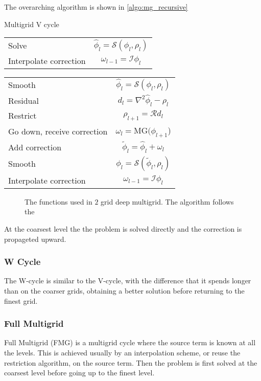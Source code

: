 		The overarching algorithm is shown in \cref{algo:mg_recursive}
		\begin{algorithm}
			\caption{Multigrid V cycle}
	        \begin{algorithmic}
				\State
				\begin{tabular}	{l | c}
					Solve &\( \widehat{\phi}_l = \mathcal{S}(\phi_l, \rho_l)\)
					\\
					Interpolate correction &\( \omega_{l-1} = \mathcal{I} \phi_l\)
				\end{tabular}
				\Else
					\State
					\begin{tabular}	{l | c}
						Smooth &\( \widehat{\phi}_l = \mathcal{S}(\phi_l, \rho_l)\)
						\\
						Residual &	\(d_l = \nabla^2\widehat{\phi}_l - \rho_l\)
						\\
						Restrict &\(\rho_{l+1} = \mathcal{R}d_l \) \nonumber
						\\
						Go down, receive correction & \(\omega_l = \text{MG}( \phi_{l+1}\))
						\\
						Add correction	&\(\widetilde{\phi}_l = \widehat{\phi}_l + \omega_l\)
						\\
						Smooth	&\(\phi_l = \mathcal{S}(\widetilde{\phi}_l, \rho_l)\)
						\\
						Interpolate correction &\( \omega_{l-1} = \mathcal{I} \phi_l\)
					\end{tabular}
	            \EndFor
				\EndIf
	        \end{algorithmic}
			\label{algo:mg_recursive}
	    \end{algorithm}


		\begin{figure}
			\centering
			
			\caption{The functions used in \(2\) grid deep multigrid. The algorithm follows the }
		\end{figure}

		At the coarsest level the the problem is solved directly and the correction is propageted upward.

	\subsubsection{W Cycle}
		The W-cycle is similar to the V-cycle, with the difference that it spends longer than on the coarser grids,
		obtaining a better solution before returning to the finest grid.

	\subsubsection{Full Multigrid}
		Full Multigrid (FMG) is a multigrid cycle where the source term is known at all the levels.
		This is achieved usually by an interpolation scheme, or reuse the restriction algorithm,
		on the source term. Then the problem is first solved at the coarsest level before going up to the finest level.


